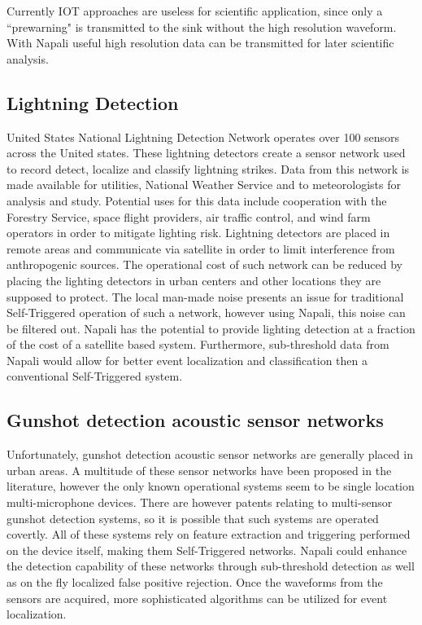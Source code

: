 Currently IOT approaches are useless for scientific application, since only a ``prewarning" is transmitted to the sink without the high resolution waveform.
With Napali useful high resolution data can be transmitted for later scientific analysis.

\subsection{Lightning Detection}\label{subsec:lightning-detection}
United States National Lightning Detection Network operates over 100 sensors across the United states. \cite{cummins1998combined}
These lightning detectors create a sensor network used to record detect, localize and  classify lightning strikes.
Data from this network is made available for utilities, National Weather Service and to meteorologists for analysis and study.
Potential uses for this data include cooperation with the Forestry Service, space flight providers, air traffic control, and wind farm operators in order to mitigate lighting risk.\cite{nag2013upgrade}
Lightning detectors are placed in remote areas and communicate via satellite in order to limit interference from anthropogenic sources.
The operational cost of such network can be reduced by placing the lighting detectors in urban centers and other locations they are supposed to protect.
The local man-made noise presents an issue for traditional Self-Triggered operation of such a network, however using Napali, this noise can be filtered out.
Napali has the potential to provide lighting detection at a fraction of the cost of a satellite based system.
Furthermore, sub-threshold data from Napali would allow for better event localization and classification then a conventional Self-Triggered system.

\subsection{Gunshot detection acoustic sensor networks}\label{subsec:gunshot-detection-acustic-sensor-network}
Unfortunately, gunshot detection acoustic sensor networks are generally placed in urban areas.
A multitude of these sensor networks have been proposed in the literature, however the only known operational systems seem to be single
location multi-microphone devices. \cite{bandi2012novel} \cite{khalid2013gunshot}
There are however patents relating to multi-sensor gunshot detection systems, so it is possible that such systems are operated covertly.
All of these systems rely on feature extraction and triggering performed on the device itself, making them Self-Triggered networks.
Napali could enhance the detection capability of these networks through sub-threshold detection as well as on the fly localized false positive rejection.
Once the waveforms from the sensors are acquired, more sophisticated algorithms can be utilized for event localization.

